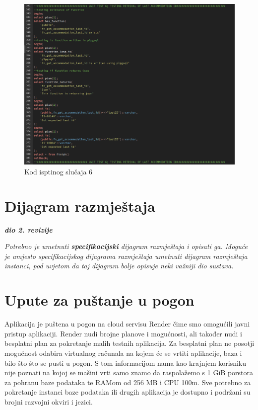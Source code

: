 				\begin{figure}[H]
					\centering
					\includegraphics[width=\textwidth]{slike/unit_tests/ut_6/code.png}
					\caption{Kod isptinog slučaja 6}
					\label{fig: IS6-kod}
				\end{figure}
				\eject
			\eject
		\section{Dijagram razmještaja}
			
			\textbf{\textit{dio 2. revizije}}
			
			 \textit{Potrebno je umetnuti \textbf{specifikacijski} dijagram razmještaja i opisati ga. Moguće je umjesto specifikacijskog dijagrama razmještaja umetnuti dijagram razmještaja instanci, pod uvjetom da taj dijagram bolje opisuje neki važniji dio sustava.}
			
			\eject 
		
		\section{Upute za puštanje u pogon}
		
			Aplikacija je puštena u pogon na cloud servisu Render čime smo omogućili javni pristup aplikaciji. Render nudi brojne planove i mogućnosti, ali također nudi i besplatni plan za pokretanje malih testnih aplikacija. Za besplatni plan ne posotji mogućnost odabira virtualnog računala na kojem će se vrtiti aplikacije, baza i bilo što što se pusti u pogon. S tom informacijom nama kao krajnjem korisniku nije poznati na kojoj se mašini vrti samo znamo da raspolažemo s 1 GiB porstora za pohranu baze podataka te RAMom od 256 MB i CPU 100m. Sve potrebno za pokretanje instanci baze podataka ili drugih aplikacija je dostupno i podržani su brojni razvojni okviri i jezici.
			
